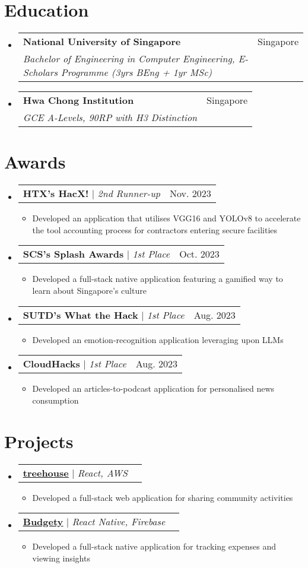 \documentclass[letterpaper,11pt]{article}
\makeatletter
\newcommand{\resumeItem}[1]{
  \item\small{
    {#1 \vspace{-2pt}}
  }
}
\newcommand{\resumeSubheading}[4]{
  \vspace{-2pt}\item
    \begin{tabular*}{0.97\textwidth}[t]{l@{\extracolsep{\fill}}r}
      \textbf{#1} & #2 \\
      \textit{\small#3} & \textit{\small #4} \\
    \end{tabular*}\vspace{-7pt}
}
\newcommand{\resumeProjectHeading}[2]{
    \item
    \begin{tabular*}{0.97\textwidth}{l@{\extracolsep{\fill}}r}
      \small#1 & #2 \\
    \end{tabular*}\vspace{-7pt}
}
\newcommand{\resumeSubHeadingListStart}{\begin{itemize}[leftmargin=0.15in, label={}]}
\newcommand{\resumeSubHeadingListEnd}{\end{itemize}}
\newcommand{\resumeItemListStart}{\begin{itemize}}
\newcommand{\resumeItemListEnd}{\end{itemize}\vspace{-5pt}}
\makeatother
\begin{document}
\section{Education}
  \resumeSubHeadingListStart
    \resumeSubheading
      {National University of Singapore}{Singapore}
      {Bachelor of Engineering in Computer Engineering, E-Scholars Programme (3yrs BEng + 1yr MSc)}{}
    \resumeSubheading
      {Hwa Chong Institution}{Singapore}
      {GCE A-Levels, 90RP with H3 Distinction}{}
\resumeSubHeadingListEnd

\section{Awards}
\resumeSubHeadingListStart
  \resumeProjectHeading
      {\textbf{HTX's HacX!} $|$ \emph{2nd Runner-up}}{Nov. 2023}
      \resumeItemListStart
        \resumeItem{Developed an application that utilises VGG16 and YOLOv8 to accelerate the tool accounting process for contractors entering secure facilities}
      \resumeItemListEnd
  \resumeProjectHeading
      {\textbf{SCS’s Splash Awards} $|$ \emph{1st Place}}{Oct. 2023}
      \resumeItemListStart
        \resumeItem{Developed a full-stack native application featuring a gamified way to learn about Singapore’s culture}
      \resumeItemListEnd
  \resumeProjectHeading
      {\textbf{SUTD's What the Hack} $|$ \emph{1st Place}}{Aug. 2023}
      \resumeItemListStart
        \resumeItem{Developed an emotion-recognition application leveraging upon LLMs}
      \resumeItemListEnd
  \resumeProjectHeading
      {\textbf{CloudHacks} $|$ \emph{1st Place}}{Aug. 2023}
      \resumeItemListStart
        \resumeItem{Developed an articles-to-podcast application for personalised news consumption}
      \resumeItemListEnd
\resumeSubHeadingListEnd

\section{Projects}
\resumeSubHeadingListStart
  \resumeProjectHeading
      {\textbf{\href{https://kenf.hashnode.dev/treehouse}{\underline{treehouse}}} $|$ \emph{React, AWS}}{}
      \resumeItemListStart
        \resumeItem{Developed a full-stack web application for sharing community activities}
      \resumeItemListEnd
  \resumeProjectHeading
      {\textbf{\href{https://github.com/duckyfuz/expense_tracker}{\underline{Budgety}}} $|$ \emph{React Native, Firebase}}{}
      \resumeItemListStart
        \resumeItem{Developed a full-stack native application for tracking expenses and viewing insights}
      \resumeItemListEnd
\resumeSubHeadingListEnd
\end{document}
